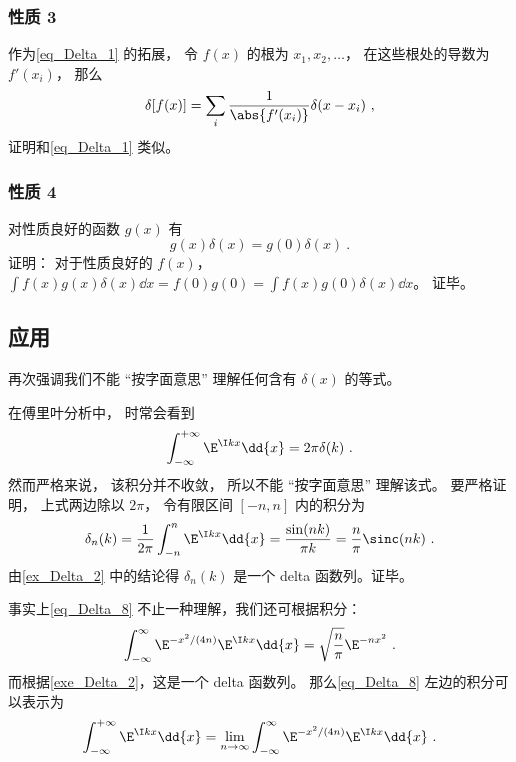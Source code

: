 \subsubsection{性质 3}
作为\autoref{eq_Delta_1} 的拓展， 令 $f(x)$ 的根为 $x_1, x_2, \dots$， 在这些根处的导数为 $f'(x_i)$， 那么
\begin{equation}\label{eq_Delta_12}
\delta[f(x)] = \sum_i \frac{1}{\abs{f'(x_i)}} \delta(x - x_i)~,
\end{equation}
证明和\autoref{eq_Delta_1} 类似。

\subsubsection{性质 4}
对性质良好的函数 $g(x)$ 有
\begin{equation}
g(x)\delta(x) = g(0)\delta(x)~.
\end{equation}
证明： 对于性质良好的 $f(x)$， $\int f(x) g(x)\delta(x) \dd{x} = f(0)g(0) = \int f(x)g(0)\delta(x) \dd{x}$。 证毕。

\subsection{应用}
再次强调我们不能 “按字面意思” 理解任何含有 $\delta(x)$ 的等式。
\begin{example}{}\label{ex_Delta_1}
在傅里叶分析中， 时常会看到
\begin{equation}\label{eq_Delta_8}
\int_{-\infty}^{+\infty} \E^{\I kx}\dd{x} = 2\pi \delta(k)~.
\end{equation}
然而严格来说， 该积分并不收敛， 所以不能 “按字面意思” 理解该式。 要严格证明， 上式两边除以 $2\pi$， 令有限区间 $[-n,n]$ 内的积分为
\begin{equation}
\delta_n(k) = \frac{1}{2\pi}\int_{-n}^{n} \E^{\I kx}\dd{x} = \frac{\sin(n k)}{\pi k} = \frac{n}{\pi} \sinc(n k)~.
\end{equation}
由\autoref{ex_Delta_2} 中的结论得 $\delta_n(k)$ 是一个 delta 函数列。证毕。
\end{example}
\begin{example}{}
事实上\autoref{eq_Delta_8} 不止一种理解，我们还可根据积分：
\begin{equation}
\int_{-\infty}^\infty \E^{-x^2/(4n)} \E^{\I k x} \dd{x} = \sqrt{\frac{n}{\pi}}\E^{-n x^2}~.
\end{equation}
而根据\autoref{exe_Delta_2}，这是一个 delta 函数列。 那么\autoref{eq_Delta_8} 左边的积分可以表示为
\begin{equation}
\int_{-\infty}^{+\infty} \E^{\I kx}\dd{x} = \lim_{n\to\infty}\int_{-\infty}^\infty \E^{-x^2/(4n)} \E^{\I k x} \dd{x}~.
\end{equation}

\end{example}

